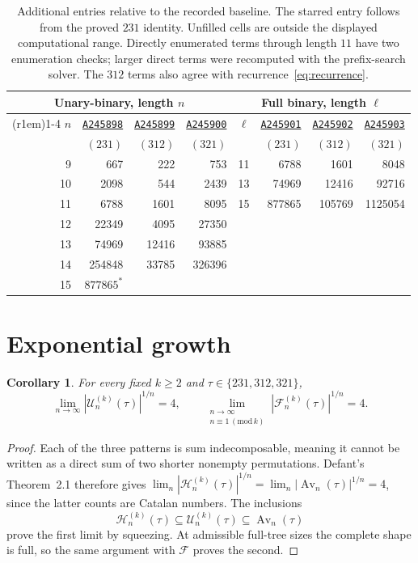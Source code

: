 \documentclass[11pt]{article}
\newtheorem{corollary}[theorem]{Corollary}
\theoremstyle{definition}
\newcommand{\Av}{\operatorname{Av}}
\newcommand{\UB}{\mathcal U}
\newcommand{\FB}{\mathcal F}
\newcommand{\HP}{\mathcal H}
\newcommand{\seq}[1]{\href{https://oeis.org/#1}{\texttt{#1}}}
\begin{document}
\begin{table}[ht]
\centering\small
\begin{tabular}{@{}rrrr@{\hskip 1.5em}rrrr@{}}
\toprule
\multicolumn{4}{c}{Unary-binary, length $n$}&\multicolumn{4}{c}{Full binary, length $\ell$}\\
\cmidrule(r{1em}){1-4}\cmidrule{5-8}
$n$&\seq{A245898}&\seq{A245899}&\seq{A245900}&$\ell$&\seq{A245901}&\seq{A245902}&\seq{A245903}\\
&$(231)$&$(312)$&$(321)$&&$(231)$&$(312)$&$(321)$\\
\midrule
9&667&222&753&11&6788&1601&8048\\
10&2098&544&2439&13&74969&12416&92716\\
11&6788&1601&8095&15&877865&105769&1125054\\
12&22349&4095&27350&&&&\\
13&74969&12416&93885&&&&\\
14&254848&33785&326396&&&&\\
15&$877865^{\ast}$&&&&&&\\
\bottomrule
\end{tabular}
\caption{Additional entries relative to the recorded baseline. The starred entry follows from the proved $231$ identity. Unfilled cells are outside the displayed computational range. Directly enumerated terms through length $11$ have two enumeration checks; larger direct terms were recomputed with the prefix-search solver. The $312$ terms also agree with recurrence~\eqref{eq:recurrence}.}\label{tab:terms}
\end{table}

\section{Exponential growth}\label{sec:growth}

\begin{corollary}\label{cor:growth}
For every fixed $k\ge2$ and $\tau\in\{231,312,321\}$,
\[
\lim_{n\to\infty}|\UB_n^{(k)}(\tau)|^{1/n}=4,
\qquad
\lim_{\substack{n\to\infty\\n\equiv1\, (\mathrm{mod}\,k)}}
|\FB_n^{(k)}(\tau)|^{1/n}=4.
\]
\end{corollary}
\begin{proof}
Each of the three patterns is sum indecomposable, meaning it cannot be written as a direct sum of two shorter nonempty permutations. Defant's Theorem~2.1 \cite{Defant2019} therefore gives
$\lim_n|\HP_n^{(k)}(\tau)|^{1/n}=\lim_n|\Av_n(\tau)|^{1/n}=4$,
since the latter counts are Catalan numbers. The inclusions
\[
\HP_n^{(k)}(\tau)\subseteq\UB_n^{(k)}(\tau)\subseteq\Av_n(\tau)
\]
prove the first limit by squeezing. At admissible full-tree sizes the complete shape is full, so the same argument with $\FB$ proves the second.
\end{proof}
\end{document}

